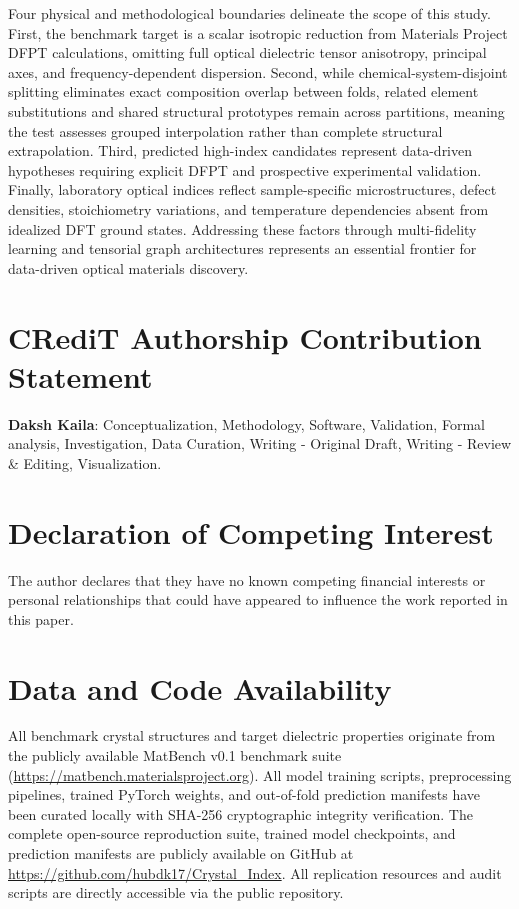 \documentclass[final,3p,times]{elsarticle}
\begin{document}
Four physical and methodological boundaries delineate the scope of this study. First, the benchmark target is a scalar isotropic reduction from Materials Project DFPT calculations, omitting full optical dielectric tensor anisotropy, principal axes, and frequency-dependent dispersion. Second, while chemical-system-disjoint splitting eliminates exact composition overlap between folds, related element substitutions and shared structural prototypes remain across partitions, meaning the test assesses grouped interpolation rather than complete structural extrapolation. Third, predicted high-index candidates represent data-driven hypotheses requiring explicit DFPT and prospective experimental validation. Finally, laboratory optical indices reflect sample-specific microstructures, defect densities, stoichiometry variations, and temperature dependencies absent from idealized DFT ground states. Addressing these factors through multi-fidelity learning and tensorial graph architectures represents an essential frontier for data-driven optical materials discovery.

\section*{CRediT Authorship Contribution Statement}
\textbf{Daksh Kaila}: Conceptualization, Methodology, Software, Validation, Formal analysis, Investigation, Data Curation, Writing - Original Draft, Writing - Review \& Editing, Visualization.

\section*{Declaration of Competing Interest}
The author declares that they have no known competing financial interests or personal relationships that could have appeared to influence the work reported in this paper.

\section*{Data and Code Availability}
All benchmark crystal structures and target dielectric properties originate from the publicly available MatBench v0.1 benchmark suite (\url{https://matbench.materialsproject.org}). All model training scripts, preprocessing pipelines, trained PyTorch weights, and out-of-fold prediction manifests have been curated locally with SHA-256 cryptographic integrity verification. The complete open-source reproduction suite, trained model checkpoints, and prediction manifests are publicly available on GitHub at \url{https://github.com/hubdk17/Crystal_Index}. All replication resources and audit scripts are directly accessible via the public repository.
\end{document}
